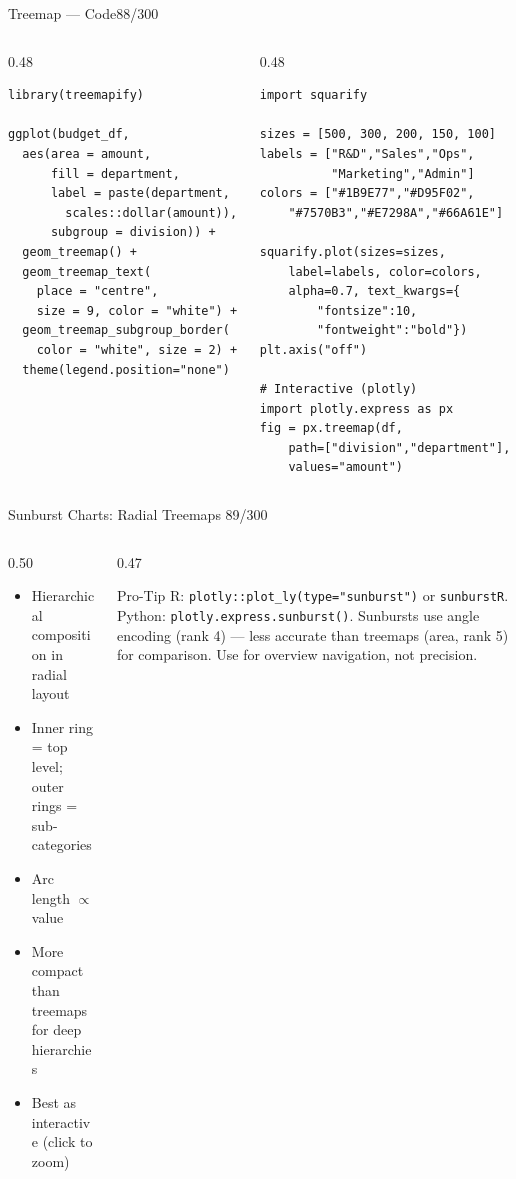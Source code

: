 \documentclass[10pt]{beamer}
\newcommand{\smark}[1]{\hfill{\scriptsize\color{codegray}#1}}
\begin{document}
\begin{frame}[fragile]{Treemap --- Code}\smark{88/300}
\begin{columns}[T]
\begin{column}{0.48\textwidth}
\begin{lstlisting}[style=Rstyle]
library(treemapify)

ggplot(budget_df,
  aes(area = amount,
      fill = department,
      label = paste(department,
        scales::dollar(amount)),
      subgroup = division)) +
  geom_treemap() +
  geom_treemap_text(
    place = "centre",
    size = 9, color = "white") +
  geom_treemap_subgroup_border(
    color = "white", size = 2) +
  theme(legend.position="none")
\end{lstlisting}
\end{column}
\begin{column}{0.48\textwidth}
\begin{lstlisting}[style=Pystyle]
import squarify

sizes = [500, 300, 200, 150, 100]
labels = ["R&D","Sales","Ops",
          "Marketing","Admin"]
colors = ["#1B9E77","#D95F02",
    "#7570B3","#E7298A","#66A61E"]

squarify.plot(sizes=sizes,
    label=labels, color=colors,
    alpha=0.7, text_kwargs={
        "fontsize":10,
        "fontweight":"bold"})
plt.axis("off")

# Interactive (plotly)
import plotly.express as px
fig = px.treemap(df,
    path=["division","department"],
    values="amount")
\end{lstlisting}
\end{column}
\end{columns}
\end{frame}

\begin{frame}{Sunburst Charts: Radial Treemaps}
\smark{89/300}
\begin{columns}[T]
\begin{column}{0.50\textwidth}
\begin{itemize}
    \item Hierarchical composition in radial layout
    \item Inner ring = top level; outer rings = sub-categories
    \item Arc length $\propto$ value
    \item More compact than treemaps for deep hierarchies
    \item Best as interactive (click to zoom)
\end{itemize}
\end{column}
\begin{column}{0.47\textwidth}
\begin{alertblock}{Pro-Tip}
    \scriptsize R: \texttt{plotly::plot\_ly(type="sunburst")} or \texttt{sunburstR}. Python: \texttt{plotly.express.sunburst()}. Sunbursts use angle encoding (rank 4) --- less accurate than treemaps (area, rank 5) for comparison. Use for overview navigation, not precision.
\end{alertblock}
\end{column}
\end{columns}
\end{frame}
\end{document}
